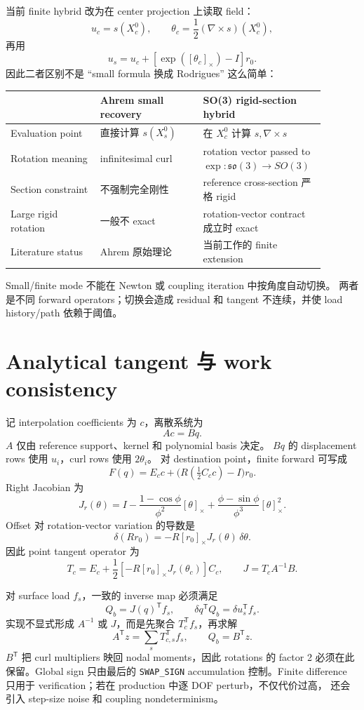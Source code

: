 \documentclass[11pt,a4paper]{article}
\newcommand{\T}{\mathsf{T}}
\newcommand{\curl}{\nabla\times}
\begin{document}
当前 finite hybrid 改为在 center projection 上读取 field：
\[
 u_c=s(X_c^0),\qquad
 \theta_c=\frac12(\curl s)(X_c^0),
\]
再用
\[
 u_s=u_c+\left[\exp([\theta_c]_\times)-I\right]r_0.
\]
因此二者区别不是 ``small formula 换成 Rodrigues'' 这么简单：
\begin{center}
\begin{tabular}{p{0.27\linewidth}p{0.31\linewidth}p{0.31\linewidth}}
\toprule
 & Ahrem small recovery & SO(3) rigid-section hybrid\\
\midrule
Evaluation point & 直接计算 $s(X_s^0)$ &
在 $X_c^0$ 计算 $s,\curl s$\\
Rotation meaning & infinitesimal curl &
rotation vector passed to $\exp:\mathfrak{so}(3)\to SO(3)$\\
Section constraint & 不强制完全刚性 &
reference cross-section 严格 rigid\\
Large rigid rotation & 一般不 exact &
rotation-vector contract 成立时 exact\\
Literature status & Ahrem 原始理论 &
当前工作的 finite extension\\
\bottomrule
\end{tabular}
\end{center}

Small/finite mode 不能在 Newton 或 coupling iteration 中按角度自动切换。
两者是不同 forward operators；切换会造成 residual 和 tangent
不连续，并使 load history/path 依赖于阈值。

\section{Analytical tangent 与 work consistency}

记 interpolation coefficients 为 $c$，离散系统为
\[
 Ac=Bq.
\]
$A$ 仅由 reference support、kernel 和 polynomial basis 决定。
$Bq$ 的 displacement rows 使用 $u_i$，curl rows 使用 $2\theta_i$。
对 destination point，finite forward 可写成
\[
 F(q)=E_c c+\bigl(R(\tfrac12C_c c)-I\bigr)r_0 .
\]
Right Jacobian 为
\[
 J_r(\theta)
 =I-\frac{1-\cos\phi}{\phi^2}[\theta]_\times
  +\frac{\phi-\sin\phi}{\phi^3}[\theta]_\times^2.
\]
Offset 对 rotation-vector variation 的导数是
\[
 \delta(Rr_0)
 =-R[r_0]_\times J_r(\theta)\,\delta\theta.
\]
因此 point tangent operator 为
\[
 T_c
 =E_c+\frac12\left[-R[r_0]_\times J_r(\theta_c)\right]C_c,
\qquad
 J=T_cA^{-1}B.
\]

对 surface load $f_s$，一致的 inverse map 必须满足
\[
 Q_b=J(q)^\T f_s,\qquad
 \delta q^\T Q_b=\delta u_s^\T f_s.
\]
实现不显式形成 $A^{-1}$ 或 $J$，而是先聚合
$T_c^\T f_s$，再求解
\[
 A^\T z=\sum_s T_{c,s}^\T f_s,\qquad Q_b=B^\T z.
\]
$B^\T$ 把 curl multipliers 映回 nodal moments，因此 rotations 的
factor 2 必须在此保留。Global sign 只由最后的
\texttt{SWAP\_SIGN} accumulation 控制。Finite difference 只用于
verification；若在 production 中逐 DOF perturb，不仅代价过高，
还会引入 step-size noise 和 coupling nondeterminism。
\end{document}
